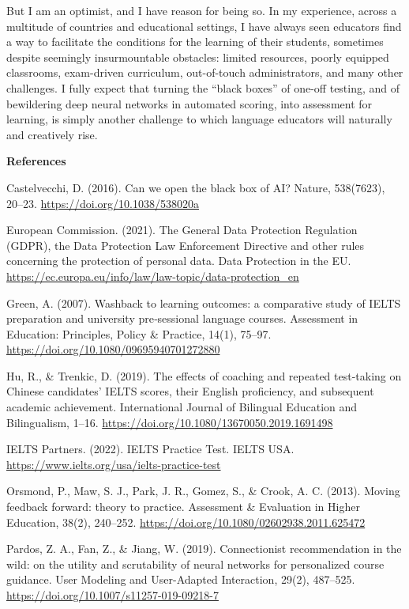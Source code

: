 \documentclass[
]{book}
\begin{document}
But I am an optimist, and I have reason for being so. In my experience, across a multitude of countries and educational settings, I have always seen educators find a way to facilitate the conditions for the learning of their students, sometimes despite seemingly insurmountable obstacles: limited resources, poorly equipped classrooms, exam-driven curriculum, out-of-touch administrators, and many other challenges. I fully expect that turning the ``black boxes'' of one-off testing, and of bewildering deep neural networks in automated scoring, into assessment for learning, is simply another challenge to which language educators will naturally and creatively rise.

\textbf{References}

Castelvecchi, D. (2016). Can we open the black box of AI? Nature, 538(7623), 20--23. \url{https://doi.org/10.1038/538020a}

European Commission. (2021). The General Data Protection Regulation (GDPR), the Data Protection Law Enforcement Directive and other rules concerning the protection of personal data. Data Protection in the EU. \url{https://ec.europa.eu/info/law/law-topic/data-protection_en}

Green, A. (2007). Washback to learning outcomes: a comparative study of IELTS preparation and university pre‐sessional language courses. Assessment in Education: Principles, Policy \& Practice, 14(1), 75--97. \url{https://doi.org/10.1080/09695940701272880}

Hu, R., \& Trenkic, D. (2019). The effects of coaching and repeated test-taking on Chinese candidates' IELTS scores, their English proficiency, and subsequent academic achievement. International Journal of Bilingual Education and Bilingualism, 1--16. \url{https://doi.org/10.1080/13670050.2019.1691498}

IELTS Partners. (2022). IELTS Practice Test. IELTS USA. \url{https://www.ielts.org/usa/ielts-practice-test}

Orsmond, P., Maw, S. J., Park, J. R., Gomez, S., \& Crook, A. C. (2013). Moving feedback forward: theory to practice. Assessment \& Evaluation in Higher Education, 38(2), 240--252. \url{https://doi.org/10.1080/02602938.2011.625472}

Pardos, Z. A., Fan, Z., \& Jiang, W. (2019). Connectionist recommendation in the wild: on the utility and scrutability of neural networks for personalized course guidance. User Modeling and User-Adapted Interaction, 29(2), 487--525. \url{https://doi.org/10.1007/s11257-019-09218-7}
\end{document}
